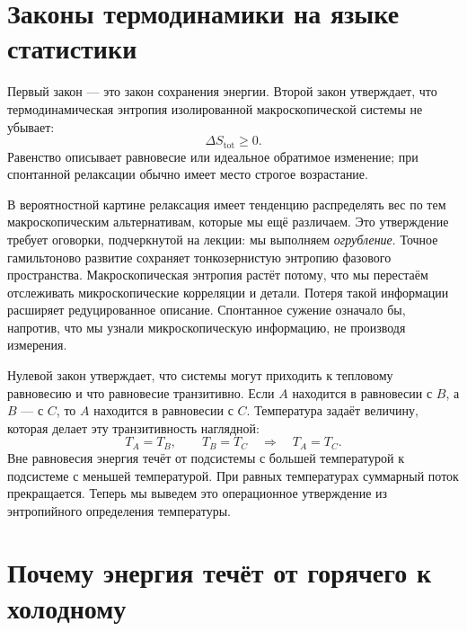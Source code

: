 \section{Законы термодинамики на языке статистики}

Первый закон — это закон сохранения энергии. Второй закон утверждает, что термодинамическая энтропия изолированной макроскопической системы не убывает:
\begin{equation}
 \Delta S_{\mathrm{tot}}\geq0.
 \label{eq:sm3-second-law}
\end{equation}
Равенство описывает равновесие или идеальное обратимое изменение; при спонтанной релаксации обычно имеет место строгое возрастание.

В вероятностной картине релаксация имеет тенденцию распределять вес по тем макроскопическим альтернативам, которые мы ещё различаем. Это утверждение требует оговорки, подчеркнутой на лекции: мы выполняем \emph{огрубление}. Точное гамильтоново развитие сохраняет тонкозернистую энтропию фазового пространства. Макроскопическая энтропия растёт потому, что мы перестаём отслеживать микроскопические корреляции и детали. Потеря такой информации расширяет редуцированное описание. Спонтанное сужение означало бы, напротив, что мы узнали микроскопическую информацию, не производя измерения.

Нулевой закон утверждает, что системы могут приходить к тепловому равновесию и что равновесие транзитивно. Если \(A\) находится в равновесии с \(B\), а \(B\) — с \(C\), то \(A\) находится в равновесии с \(C\). Температура задаёт величину, которая делает эту транзитивность наглядной:
\[
 T_A=T_B,\qquad T_B=T_C
 \quad\Longrightarrow\quad
 T_A=T_C.
\]
Вне равновесия энергия течёт от подсистемы с большей температурой к подсистеме с меньшей температурой. При равных температурах суммарный поток прекращается. Теперь мы выведем это операционное утверждение из энтропийного определения температуры.

\section{Почему энергия течёт от горячего к холодному}

